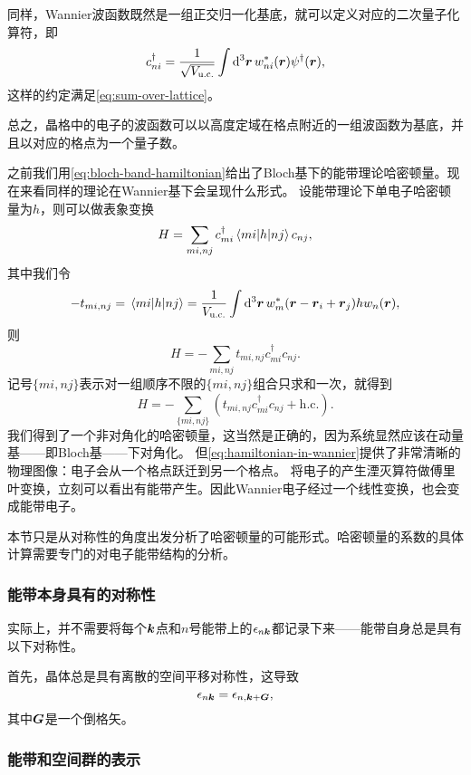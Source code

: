 同样，Wannier波函数既然是一组正交归一化基底，就可以定义对应的二次量子化算符，即
\begin{equation}
    {c}^\dagger_{ni} = \frac{1}{\sqrt{V_\text{u.c.}}} \int \dd[3]{\vb*{r}} w_{ni}^*(\vb*{r}) {\psi}^\dagger(\vb*{r}),
    \label{eq:wannier-and-free}
\end{equation}
这样的约定满足\eqref{eq:sum-over-lattice}。

总之，晶格中的电子的波函数可以以高度定域在格点附近的一组波函数为基底，并且以对应的格点为一个量子数。

之前我们用\eqref{eq:bloch-band-hamiltonian}给出了Bloch基下的能带理论哈密顿量。现在来看同样的理论在Wannier基下会呈现什么形式。
设能带理论下单电子哈密顿量为${h}$，则可以做表象变换
\[
    {H} = \sum_{mi, nj} {c}^\dagger_{mi} \mel{mi}{{h}}{nj} {c}_{nj},
\]
其中我们令
\begin{equation}
    - t_{mi, nj} = \mel{mi}{{h}}{nj} = \frac{1}{V_\text{u.c.}} \int \dd[3]{\vb*{r}} w_m^*(\vb*{r} - \vb*{r}_i + \vb*{r}_j) {h} w_n(\vb*{r}),
\end{equation}
则
\[
    {H} = - \sum_{mi, nj} t_{mi, nj} {c}^\dagger_{mi} {c}_{nj}.
\]
记号$\{mi, nj\}$表示对一组顺序不限的$\{mi, nj\}$组合只求和一次，就得到
\begin{equation}
    {H} = - \sum_{\{mi, nj\}} (t_{mi, nj} {c}_{mi}^\dagger {c}_{nj} + \text{h.c.}).
    \label{eq:hamiltonian-in-wannier}
\end{equation}
我们得到了一个非对角化的哈密顿量，这当然是正确的，因为系统显然应该在动量基——即Bloch基——下对角化。
但\eqref{eq:hamiltonian-in-wannier}提供了非常清晰的物理图像：电子会从一个格点跃迁到另一个格点。
将电子的产生湮灭算符做傅里叶变换，立刻可以看出有能带产生。因此Wannier电子经过一个线性变换，也会变成能带电子。

本节只是从对称性的角度出发分析了哈密顿量的可能形式。哈密顿量的系数的具体计算需要专门的对电子能带结构的分析。

\subsubsection{能带本身具有的对称性}

实际上，并不需要将每个$\vb*{k}$点和$n$号能带上的$\epsilon_{n \vb*{k}}$都记录下来——能带自身总是具有以下对称性。

首先，晶体总是具有离散的空间平移对称性，这导致
\begin{equation}
    \epsilon_{n \vb*{k}} = \epsilon_{n, \vb*{k} + \vb*{G}},
\end{equation}
其中$\vb*{G}$是一个倒格矢。
\subsubsection{能带和空间群的表示}


